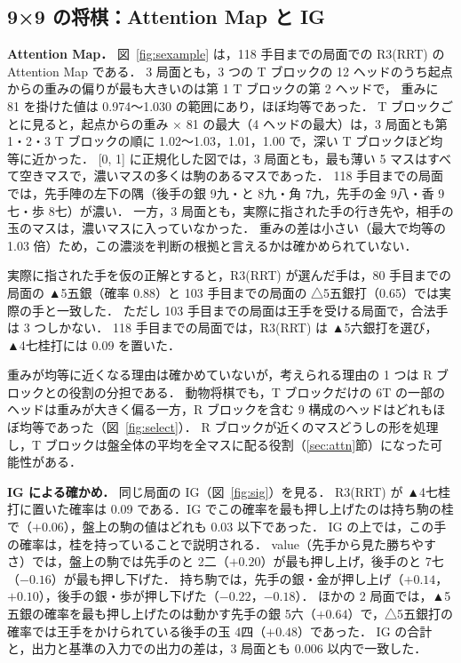 \documentclass[submit]{ipsj}
\begin{document}
\subsection{9×9 の将棋：Attention Map と IG}
\label{sec:shogi}
\textbf{Attention Map．}
図~\ref{fig:sexample} は，118 手目までの局面での R3(RRT) の Attention Map である．
3 局面とも，3 つの T ブロックの 12 ヘッドのうち起点からの重みの偏りが最も大きいのは第 1 T ブロックの第 2 ヘッドで，
重みに 81 を掛けた値は 0.974〜1.030 の範囲にあり，ほぼ均等であった．
T ブロックごとに見ると，起点からの重み × 81 の最大（4 ヘッドの最大）は，3 局面とも第 1・2・3 T ブロックの順に 1.02〜1.03，1.01，1.00 で，深い T ブロックほど均等に近かった．
[0, 1] に正規化した図では，3 局面とも，最も薄い 5 マスはすべて空きマスで，濃いマスの多くは駒のあるマスであった．
118 手目までの局面では，先手陣の左下の隅（後手の銀 9九・と 8九・角 7九，先手の金 9八・香 9七・歩 8七）が濃い．
一方，3 局面とも，実際に指された手の行き先や，相手の玉のマスは，濃いマスに入っていなかった．
重みの差は小さい（最大で均等の 1.03 倍）ため，この濃淡を判断の根拠と言えるかは確かめられていない．

実際に指された手を仮の正解とすると，R3(RRT) が選んだ手は，80 手目までの局面の ▲5五銀（確率 0.88）と 103 手目までの局面の △5五銀打（0.65）では実際の手と一致した．
ただし 103 手目までの局面は王手を受ける局面で，合法手は 3 つしかない．
118 手目までの局面では，R3(RRT) は ▲5六銀打を選び，▲4七桂打には 0.09 を置いた．

重みが均等に近くなる理由は確かめていないが，考えられる理由の 1 つは R ブロックとの役割の分担である．
動物将棋でも，T ブロックだけの 6T の一部のヘッドは重みが大きく偏る一方，R ブロックを含む 9 構成のヘッドはどれもほぼ均等であった（図~\ref{fig:select}）．
R ブロックが近くのマスどうしの形を処理し，T ブロックは盤全体の平均を全マスに配る役割（\ref{sec:attn}節）になった可能性がある．

\textbf{IG による確かめ．}
同じ局面の IG（図~\ref{fig:sig}）を見る．
R3(RRT) が ▲4七桂打に置いた確率は 0.09 である．IG でこの確率を最も押し上げたのは持ち駒の桂で（$+0.06$），盤上の駒の値はどれも 0.03 以下であった．
IG の上では，この手の確率は，桂を持っていることで説明される．
value（先手から見た勝ちやすさ）では，盤上の駒では先手のと 2二（$+0.20$）が最も押し上げ，後手のと 7七（$-0.16$）が最も押し下げた．
持ち駒では，先手の銀・金が押し上げ（$+0.14$，$+0.10$），後手の銀・歩が押し下げた（$-0.22$，$-0.18$）．
ほかの 2 局面では，▲5五銀の確率を最も押し上げたのは動かす先手の銀 5六（$+0.64$）で，△5五銀打の確率では王手をかけられている後手の玉 4四（$+0.48$）であった．
IG の合計と，出力と基準の入力での出力の差は，3 局面とも 0.006 以内で一致した．
\end{document}
